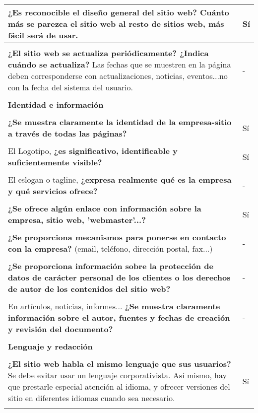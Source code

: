 \begin{longtable}[H]{p{31em}|p{5em}}
\textbf{¿Es reconocible el diseño general del sitio web?} Cuánto más se parezca el sitio web al resto de sitios web, más fácil será de usar. & Sí \\ \hline \\[-1em]
\textbf{¿El sitio web se actualiza periódicamente? ¿Indica cuándo se actualiza?} Las fechas que se muestren en la página deben corresponderse con actualizaciones, noticias, eventos...no con la fecha del sistema del usuario. & - \\ \hline \\[-1em]
\multicolumn{2}{p{36em}}{\cellcolor[rgb]{ .851,  .886,  .953} \textbf{Identidad e información}} \\ \hline \\[-1em]
\textbf{¿Se muestra claramente la identidad de la empresa-sitio a través de todas las páginas?} & Sí \\ \hline \\[-1em]
El Logotipo, \textbf{¿es significativo, identificable y suficientemente visible?} & Sí \\ \hline \\[-1em]
El eslogan o tagline, \textbf{¿expresa realmente qué es la empresa y qué servicios ofrece?} & - \\ \hline \\[-1em]
\textbf{¿Se ofrece algún enlace con información sobre la empresa, sitio web, 'webmaster’...? } & Sí \\ \hline \\[-1em]
\textbf{¿Se proporciona mecanismos para ponerse en contacto con la empresa?} (email, teléfono, dirección postal, fax...) & - \\ \hline \\[-1em]
\textbf{¿Se proporciona información sobre la protección de datos de carácter personal de los clientes o los derechos de autor de los contenidos del sitio web?} & - \\ \hline \\[-1em]
En artículos, noticias, informes... \textbf{¿Se muestra claramente información sobre el autor, fuentes y fechas de creación y revisión del documento? } & - \\ \hline \\[-1em]
\multicolumn{2}{p{36em}}{\cellcolor[rgb]{ .851,  .886,  .953} \textbf{Lenguaje y redacción}} \\ \hline \\[-1em]
\textbf{¿El sitio web habla el mismo lenguaje que sus usuarios?} Se debe evitar usar un lenguaje corporativista. Así mismo, hay que prestarle especial atención al idioma, y ofrecer versiones del sitio en diferentes idiomas cuando sea necesario. & Sí \\ \hline \\[-1em]

\end{longtable}
